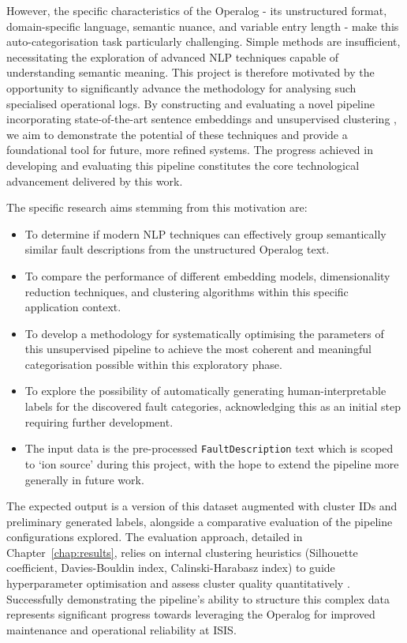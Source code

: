 \documentclass[10pt,oneside]{report}
\begin{document}
However, the specific characteristics of the Operalog - its unstructured format, domain-specific language, semantic nuance, and variable entry length - make this auto-categorisation task particularly challenging. Simple methods are insufficient, necessitating the exploration of advanced NLP techniques capable of understanding semantic meaning. This project is therefore motivated by the opportunity to significantly advance the methodology for analysing such specialised operational logs. By constructing and evaluating a novel pipeline incorporating state-of-the-art sentence embeddings \cite{song2020mpnet, nussbaum2024nomic} and unsupervised clustering \cite{kmedoids, ester1996density, campello2013density}, we aim to demonstrate the potential of these techniques and provide a foundational tool for future, more refined systems. The progress achieved in developing and evaluating this pipeline constitutes the core technological advancement delivered by this work.

The specific research aims stemming from this motivation are:

\begin{itemize}
    \item To determine if modern NLP techniques can effectively group semantically similar fault descriptions from the unstructured Operalog text.
    \item To compare the performance of different embedding models, dimensionality reduction techniques, and clustering algorithms within this specific application context.
    \item To develop a methodology for systematically optimising the parameters of this unsupervised pipeline to achieve the most coherent and meaningful categorisation possible within this exploratory phase.
    \item To explore the possibility of automatically generating human-interpretable labels for the discovered fault categories, acknowledging this as an initial step requiring further development.
    \item The input data is the pre-processed \texttt{FaultDescription} text which is scoped to `ion source' during this project, with the hope to extend the pipeline more generally in future work.
\end{itemize}

The expected output is a version of this dataset augmented with cluster IDs and preliminary generated labels, alongside a comparative evaluation of the pipeline configurations explored. The evaluation approach, detailed in Chapter~\ref{chap:results}, relies on internal clustering heuristics (Silhouette coefficient, Davies-Bouldin index, Calinski-Harabasz index) to guide hyperparameter optimisation and assess cluster quality quantitatively \cite{rousseeuw1987silhouettes, davies1979cluster, calinski1974dendrite}. Successfully demonstrating the pipeline's ability to structure this complex data represents significant progress towards leveraging the Operalog for improved maintenance and operational reliability at ISIS.
\end{document}
